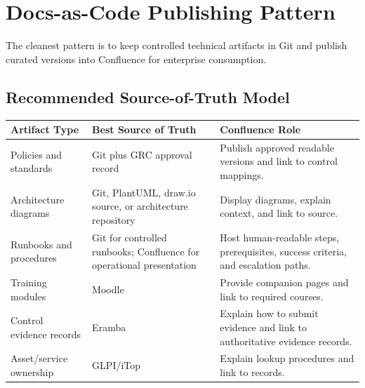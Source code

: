 \documentclass[10pt,letterpaper]{article}
\begin{document}
\section{Docs-as-Code Publishing Pattern}

The cleanest pattern is to keep controlled technical artifacts in Git and publish curated versions into Confluence for enterprise consumption.

\begin{center}
\end{center}

\subsection{Recommended Source-of-Truth Model}

\begin{tabularx}{\textwidth}{L{1.85in} L{2.2in} Y}
\toprule
\textbf{Artifact Type} & \textbf{Best Source of Truth} & \textbf{Confluence Role} \\
\midrule
Policies and standards & Git plus GRC approval record & Publish approved readable versions and link to control mappings. \\
Architecture diagrams & Git, PlantUML, draw.io source, or architecture repository & Display diagrams, explain context, and link to source. \\
Runbooks and procedures & Git for controlled runbooks; Confluence for operational presentation & Host human-readable steps, prerequisites, success criteria, and escalation paths. \\
Training modules & Moodle & Provide companion pages and link to required courses. \\
Control evidence records & Eramba & Explain how to submit evidence and link to authoritative evidence records. \\
Asset/service ownership & GLPI/iTop & Explain lookup procedures and link to records. \\
\bottomrule
\end{tabularx}
\end{document}

